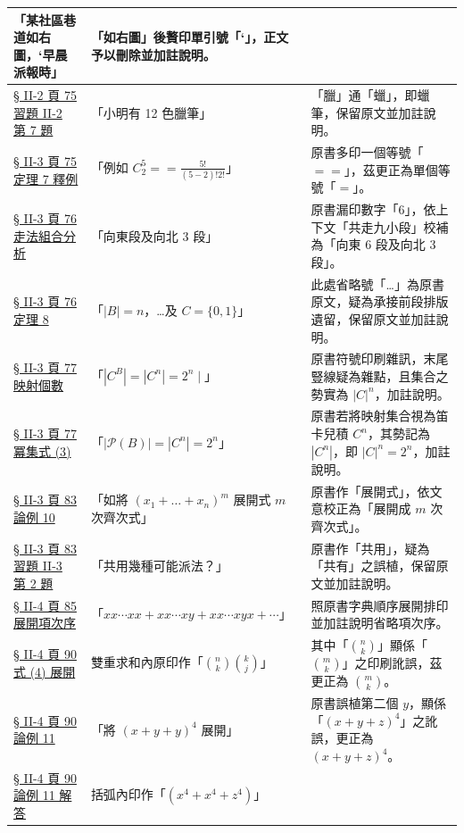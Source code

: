 \documentclass[a4paper,12pt,twoside]{article}
\begin{document}
\begin{xltabular}{\textwidth}{|p{3.2cm}|p{3.8cm}|X|}
「某社區巷道如右圖，‘早晨派報時」 & 
「如右圖」後贅印單引號「‘」，正文予以刪除並加註說明。 \\
\hline
\hyperref[note:b5-ch2-p75-q7-crayon]{§ II-2 頁 75 習題 II-2 第 7 題} & 
「小明有 12 色臘筆」 & 
「臘」通「蠟」，即蠟筆，保留原文並加註說明。 \\
\hline
\hyperref[note:b5-ch2-p75-eq]{§ II-3 頁 75 定理 7 釋例} & 
「例如 $C_2^5 == \frac{5!}{(5-2)! 2!}$」 & 
原書多印一個等號「$==$」，茲更正為單個等號「$=$」。 \\
\hline
\hyperref[note:b5-ch2-p76-east6]{§ II-3 頁 76 走法組合分析} & 
「向東段及向北 3 段」 & 
原書漏印數字「6」，依上下文「共走九小段」校補為「向東 6 段及向北 3 段」。 \\
\hline
\hyperref[note:b5-ch2-p76-thm8-dots]{§ II-3 頁 76 定理 8} & 
「$|B| = n$，\dots 及 $C = \{0, 1\}$」 & 
此處省略號「\dots」為原書原文，疑為承接前段排版遺留，保留原文並加註說明。 \\
\hline
\hyperref[note:b5-ch2-p77-cb]{§ II-3 頁 77 映射個數} & 
「$|C^B| = |C^n| = 2^n \mid$」 & 
原書符號印刷雜訊，末尾豎線疑為雜點，且集合之勢實為 $|C|^n$，加註說明。 \\
\hline
\hyperref[note:b5-ch2-p77-pn]{§ II-3 頁 77 冪集式 (3)} & 
「$|\mathscr{P}(B)| = |C^n| = 2^n$」 & 
原書若將映射集合視為笛卡兒積 $C^n$，其勢記為 $|C^n|$，即 $|C|^n = 2^n$，加註說明。 \\
\hline
\hyperref[note:b5-ch2-p83-zhankai]{§ II-3 頁 83 論例 10} & 
「如將 $(x_1 + \dots + x_n)^m$ 展開式 $m$ 次齊次式」 & 
原書作「展開式」，依文意校正為「展開成 $m$ 次齊次式」。 \\
\hline
\hyperref[note:b5-ch2-p83-gongyong]{§ II-3 頁 83 習題 II-3 第 2 題} & 
「共用幾種可能派法？」 & 
原書作「共用」，疑為「共有」之誤植，保留原文並加註說明。 \\
\hline
\hyperref[note:b5-ch2-p85-expand]{§ II-4 頁 85 展開項次序} & 
「$xx\cdots xx + xx\cdots xy + xx\cdots xyx + \cdots$」 & 
照原書字典順序展開排印並加註說明省略項次序。 \\
\hline
\hyperref[note:b5-ch2-p90-binom]{§ II-4 頁 90 式 (4) 展開} & 
雙重求和內原印作「$\binom{n}{k} \binom{k}{j}$」 & 
其中「$\binom{n}{k}$」顯係「$\binom{m}{k}$」之印刷訛誤，茲更正為 $\binom{m}{k}$。 \\
\hline
\hyperref[note:b5-ch2-p90-ex11-typo]{§ II-4 頁 90 論例 11} & 
「將 $(x+y+y)^4$ 展開」 & 
原書誤植第二個 $y$，顯係「$(x+y+z)^4$」之訛誤，更正為 $(x+y+z)^4$。 \\
\hline
\hyperref[note:b5-ch2-p90-ex11-y4]{§ II-4 頁 90 論例 11 解答} & 
括弧內印作「$(x^4 + x^4 + z^4)$」 & 

\end{xltabular}
\end{document}
